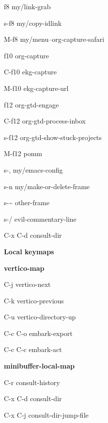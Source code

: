 \documentclass[10pt]{article}
\renewcommand\section[1]{\bigskip\par\textbf{\color{heading}\large#1}\smallskip}
\renewcommand\subsection[1]{\smallskip\par\textbf{\color{heading}#1}}
\begin{document}
\begin{multicols}{4}
\begin{keylist}
    \item[f8] my/link-grab
    \item[s-f8] my/copy-idlink
    \item[M-f8] my/menu--org-capture-safari

    \item[f10] org-capture
    \item[C-f10] ekg-capture
    \item[M-f10] ekg-capture-url

    \item[f12] org-gtd-engage
    \item[C-f12] org-gtd-process-inbox
    \item[s-f12] org-gtd-show-stuck-projects
    \item[M-f12] pomm

    \item[s-,] my/emacs-config

    \item[s-n] my/make-or-delete-frame
    \item[s-\~] other-frame

    \item[s-/] evil-commentary-line

    \item[C-x C-d] consult-dir
  \end{keylist}
  \section{Local keymaps}
  \subsection{vertico-map}
  \begin{keylist}
    \item[C-j] vertico-next
    \item[C-k] vertico-previous
    \item[C-u] vertico-directory-up
    \item[C-c C-o] embark-export
    \item[C-c C-c] embark-act
  \end{keylist}
  \subsection{minibuffer-local-map}
  \begin{keylist}
    \item[C-r] consult-history
    \item[C-x C-d] consult-dir
    \item[C-x C-j] consult-dir-jump-file
  \end{keylist}

\end{multicols}
\end{document}
